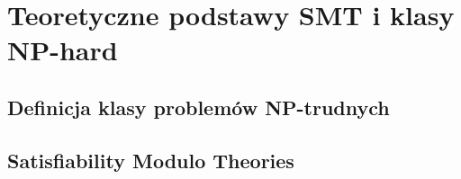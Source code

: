 \chapter{Teoretyczne podstawy SMT i klasy NP-hard}

\section{Definicja klasy problemów NP-trudnych}

\section{Satisfiability Modulo Theories}



